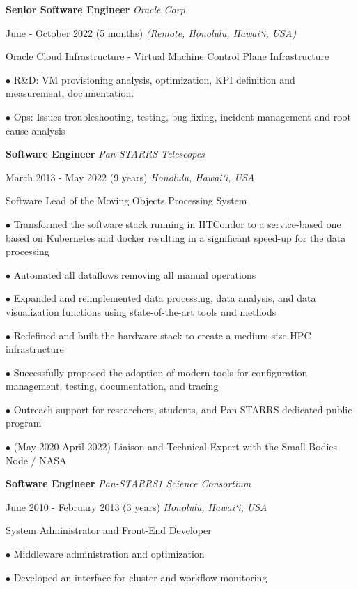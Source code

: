 \documentclass[12pt]{article}
\newcommand{\mynewsection}[2]{%
  \medskip

  \textbf{\color{colorsection}\LARGE {#1}\hspace{0.25in}{#2}}
}
\newcommand{\experience}[4]{%
  \medskip
  {\color{colorsection}\textbf{\large #1}}
  \hfill
  \textit{\small #2}

  {\small #3}
  \hfill    
  \textit{\small #4}}
\begin{document}
\begin{minipage}[t]{0.67\linewidth}
  \mynewsection{\faBriefcase}{Experience}
  
  \experience{Senior Software Engineer}{Oracle Corp.}{June -
    October 2022 (5 months)}{(Remote, Honolulu, Hawai`i, USA)}

  \medskip
  
  {\large Oracle Cloud Infrastructure - Virtual Machine Control Plane
    Infrastructure}

  $\bullet$ R\&D: VM provisioning analysis, optimization, KPI
  definition and measurement, documentation.

  $\bullet$ Ops: Issues troubleshooting, testing, bug fixing, incident
  management and root cause analysis
  
  \medskip

  \experience{Software Engineer}{Pan-STARRS Telescopes}{March
    2013 - May 2022 (9 years)}{Honolulu, Hawai`i, USA}

  \medskip
  
  {\large Software Lead of the Moving Objects Processing System}
  
  $\bullet$ Transformed the software stack running in HTCondor to a
  service-based one based on Kubernetes and docker resulting in a
  significant speed-up for the data processing
  
  $\bullet$ Automated all dataflows removing all manual
  operations

  $\bullet$ Expanded and reimplemented data processing, data analysis,
  and data visualization functions using state-of-the-art tools and
  methods

  $\bullet$ Redefined and built the hardware stack to create a
  medium-size HPC infrastructure

  $\bullet$ Successfully proposed the adoption of modern tools for
  configuration management, testing, documentation, and tracing

  $\bullet$ Outreach support for researchers, students, and Pan-STARRS
  dedicated public program

  $\bullet$ (May 2020-April 2022) Liaison and Technical Expert with
  the Small Bodies Node / NASA
  
  \experience{Software Engineer}{Pan-STARRS1 Science Consortium}{June
    2010 - February 2013 (3 years)}{Honolulu, Hawai`i, USA}

  \medskip

  {\large System Administrator and Front-End Developer}
  
  $\bullet$ Middleware administration and optimization
  
  $\bullet$ Developed an interface for cluster and workflow monitoring
\end{minipage}
\end{document}
